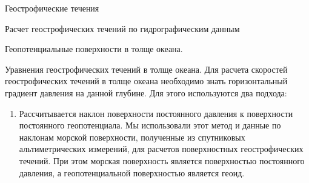 \begin{chapter}{Геострофические течения}
\begin{section}{Расчет геострофических течений по гидрографическим данным}
\begin{paragraph}{Геопотенциальные поверхности в толще океана.}
%
\end{paragraph}

\begin{paragraph}{Уравнения геострофических течений в толще океана.}
Для расчета скоростей геострофических течений в толще океана
необходимо знать горизонтальный градиент давления на данной
глубине. Для этого используются два подхода:
%
\begin{enumerate}
\item
Рассчитывается наклон поверхности постоянного давления к поверхности
постоянного геопотенциала. Мы использовали этот метод и данные по
наклонам морской поверхности, полученные из спутниковых
альтиметрических измерений, для расчетов поверхностных геострофических
течений. При этом морская поверхность является поверхностью
постоянного давления, а геопотенциальной поверхностью является геоид.
%


\end{enumerate}
\end{paragraph}
\end{section}
\end{chapter}
